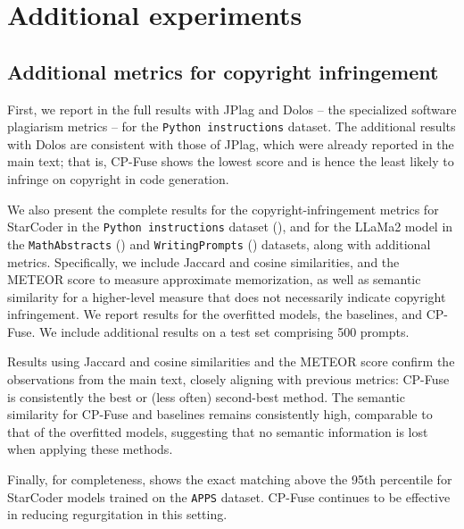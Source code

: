 \section{Additional experiments}

\subsection{Additional metrics for copyright infringement}
\label{app:more_copyright}


First, we report in  the full results with JPlag \citep{prechelt2002finding} and Dolos \citep{maertens2022dolos} -- the specialized software plagiarism metrics -- for the \texttt{Python instructions} dataset. The additional results with Dolos are consistent with those of JPlag, which were already reported in the main text; that is, CP-Fuse shows the lowest score and is hence the least likely to infringe on copyright in code generation.

We also present the complete results for the copyright-infringement metrics for StarCoder in the \texttt{Python instructions} dataset (), and for the LLaMa2 model in the \texttt{MathAbstracts} () and \texttt{WritingPrompts} () datasets, along with additional metrics. Specifically, we include Jaccard and cosine similarities, and the METEOR score to measure approximate memorization, as well as semantic similarity for a higher-level measure that does not necessarily indicate copyright infringement. We report results for the overfitted models, the baselines, and CP-Fuse. We include additional results on a test set comprising 500 prompts. 

Results using Jaccard and cosine similarities and the METEOR score confirm the observations from the main text, closely aligning with previous metrics: CP-Fuse is consistently the best or (less often) second-best method. The semantic similarity for CP-Fuse and baselines remains consistently high, comparable to that of the overfitted models, suggesting that no semantic information is lost when applying these methods.

Finally, for completeness,  shows the exact matching above the 95th percentile for StarCoder models trained on the \texttt{APPS} dataset. CP-Fuse continues to be effective in reducing regurgitation in this setting.




